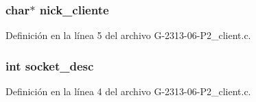 \subsubsection[{\texorpdfstring{nick\+\_\+cliente}{nick_cliente}}]{\setlength{\rightskip}{0pt plus 5cm}char$\ast$ nick\+\_\+cliente}\hypertarget{G-2313-06-P2__files_8c_ab93a317ee9a27c82844c9128a76b136a}{}\label{G-2313-06-P2__files_8c_ab93a317ee9a27c82844c9128a76b136a}


Definición en la línea 5 del archivo G-\/2313-\/06-\/\+P2\+\_\+client.\+c.

\subsubsection[{\texorpdfstring{socket\+\_\+desc}{socket_desc}}]{\setlength{\rightskip}{0pt plus 5cm}int socket\+\_\+desc}\hypertarget{G-2313-06-P2__files_8c_adeadf7cb6916a10c7142ce7d265ab32a}{}\label{G-2313-06-P2__files_8c_adeadf7cb6916a10c7142ce7d265ab32a}


Definición en la línea 4 del archivo G-\/2313-\/06-\/\+P2\+\_\+client.\+c.


